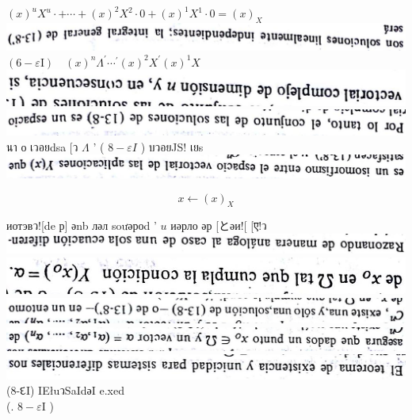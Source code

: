 \documentclass[10pt]{article}
\theoremstyle{plain}
\theoremstyle{definition}
\theoremstyle{remark}
\begin{document}
$(x)^{u} X^{u} \cdot+\cdots+(x)^{2} X^{2} \cdot 0+(x)^{1} X^{1} \cdot 0=(x)_{X}$\\
\includegraphics[max width=\textwidth, center]{2025_09_05_adecef5eb2053bc129b5g-331(8)}\\
$(6-\varepsilon \mathrm{I}) \quad(x)^{n} \Lambda^{\prime} \cdots{ }^{\prime}(x)^{2} X^{\prime}(x)^{1} X$\\
\includegraphics[max width=\textwidth, center]{2025_09_05_adecef5eb2053bc129b5g-331(3)}\\
\includegraphics[max width=\textwidth]{2025_09_05_adecef5eb2053bc129b5g-331(5)} นา о เวอยdsa [ว $\Lambda$ ' ( $8-\varepsilon I$ ) บวอยJS! เยs\\
\includegraphics[max width=\textwidth, center]{2025_09_05_adecef5eb2053bc129b5g-331(10)}

$$
x \leftarrow(x)_{X}
$$

иотэвว![de р] әnb ләл soưәроd ' $u$ иәрло әр [とәи![ [ए!ว\\
\includegraphics[max width=\textwidth, center]{2025_09_05_adecef5eb2053bc129b5g-331(1)}\\
\includegraphics[max width=\textwidth, center]{2025_09_05_adecef5eb2053bc129b5g-331(7)}\\
\includegraphics[max width=\textwidth, center]{2025_09_05_adecef5eb2053bc129b5g-331}\\
\includegraphics[max width=\textwidth, center]{2025_09_05_adecef5eb2053bc129b5g-331(4)}\\
\includegraphics[max width=\textwidth, center]{2025_09_05_adecef5eb2053bc129b5g-331(2)}\\
(8-દI) IEłuวSaIdәI e.xed\\
(. $8-\varepsilon \mathrm{I}$ )
\end{document}
